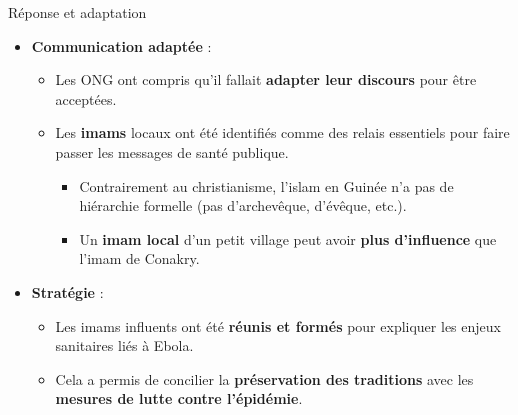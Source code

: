 \documentclass[
  ignorenonframetext,
]{beamer}
\providecommand{\tightlist}{%
  \setlength{\itemsep}{0pt}\setlength{\parskip}{0pt}}\usepackage{longtable,booktabs,array}
\begin{document}
\begin{frame}
\begin{block}{Réponse et adaptation}
\protect\hypertarget{ruxe9ponse-et-adaptation}{}
\begin{itemize}
\tightlist
\item
  \textbf{Communication adaptée} :

  \begin{itemize}
  \tightlist
  \item
    Les ONG ont compris qu'il fallait \textbf{adapter leur discours}
    pour être acceptées.
  \item
    Les \textbf{imams} locaux ont été identifiés comme des relais
    essentiels pour faire passer les messages de santé publique.

    \begin{itemize}
    \tightlist
    \item
      Contrairement au christianisme, l'islam en Guinée n'a pas de
      hiérarchie formelle (pas d'archevêque, d'évêque, etc.).
    \item
      Un \textbf{imam local} d'un petit village peut avoir \textbf{plus
      d'influence} que l'imam de Conakry.
    \end{itemize}
  \end{itemize}
\item
  \textbf{Stratégie} :

  \begin{itemize}
  \tightlist
  \item
    Les imams influents ont été \textbf{réunis et formés} pour expliquer
    les enjeux sanitaires liés à Ebola.
  \item
    Cela a permis de concilier la \textbf{préservation des traditions}
    avec les \textbf{mesures de lutte contre l'épidémie}.
  \end{itemize}
\end{itemize}
\end{block}
\end{frame}
\end{document}
